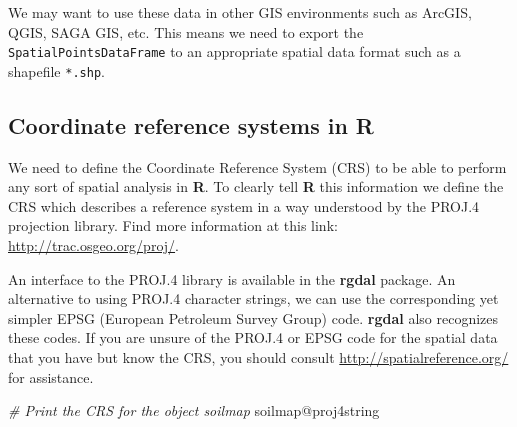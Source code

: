 \documentclass[
  10pt,
  b5paper,
  oneside]{book}
\newenvironment{Shaded}{\begin{snugshade}}{\end{snugshade}}
\newcommand{\AttributeTok}[1]{\textcolor[rgb]{0.77,0.63,0.00}{#1}}
\newcommand{\CommentTok}[1]{\textcolor[rgb]{0.56,0.35,0.01}{\textit{#1}}}
\newcommand{\ConstantTok}[1]{\textcolor[rgb]{0.00,0.00,0.00}{#1}}
\newcommand{\FunctionTok}[1]{\textcolor[rgb]{0.00,0.00,0.00}{#1}}
\newcommand{\NormalTok}[1]{#1}
\newcommand{\OtherTok}[1]{\textcolor[rgb]{0.56,0.35,0.01}{#1}}
\newcommand{\SpecialCharTok}[1]{\textcolor[rgb]{0.00,0.00,0.00}{#1}}
\newcommand{\StringTok}[1]{\textcolor[rgb]{0.31,0.60,0.02}{#1}}
\theoremstyle{definition}
\theoremstyle{definition}
\theoremstyle{definition}
\theoremstyle{definition}
\theoremstyle{remark}
\begin{document}
We may want to use these data in other GIS environments such as ArcGIS, QGIS, SAGA GIS, etc. This means we need to export the \texttt{SpatialPointsDataFrame} to an appropriate spatial data format such as a shapefile \texttt{*.shp}.

\begin{Shaded}
\end{Shaded}

\hypertarget{coordinate-reference-systems-in-r}{%
\subsection{Coordinate reference systems in R}\label{coordinate-reference-systems-in-r}}

We need to define the Coordinate Reference System (CRS) to be able to perform any sort of spatial analysis in \textbf{R}. To clearly tell \textbf{R} this information we define the CRS which describes a reference system in a way understood by the PROJ.4 projection library. Find more information at this link: \url{http://trac.osgeo.org/proj/}.

An interface to the PROJ.4 library is available in the \textbf{rgdal} package. An alternative to using PROJ.4 character strings, we can use the corresponding yet simpler EPSG (European Petroleum Survey Group) code. \textbf{rgdal} also recognizes these codes. If you are unsure of the PROJ.4 or EPSG code for the spatial data that you have but know the CRS, you should consult \url{http://spatialreference.org/} for assistance.

\begin{Shaded}
\begin{Highlighting}[]
\CommentTok{\# Print the CRS for the object soilmap}
\NormalTok{soilmap}\SpecialCharTok{@}\NormalTok{proj4string}
\end{Highlighting}
\end{Shaded}
\end{document}

